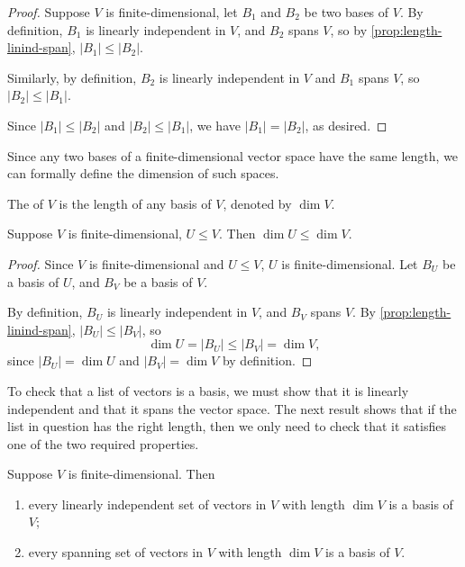 \begin{proof}
Suppose $V$ is finite-dimensional, let $B_1$ and $B_2$ be two bases of $V$. By definition, $B_1$ is linearly independent in $V$, and $B_2$ spans $V$, so by \cref{prop:length-linind-span}, $|B_1|\le|B_2|$.

Similarly, by definition, $B_2$ is linearly independent in $V$ and $B_1$ spans $V$, so $|B_2|\le|B_1|$.

Since $|B_1|\le|B_2|$ and $|B_2|\le|B_1|$, we have $|B_1|=|B_2|$, as desired.
\end{proof}

Since any two bases of a finite-dimensional vector space have the same length, we can formally define the dimension of such spaces.

\begin{definition}[Dimension]
The  of $V$ is the length of any basis of $V$, denoted by $\dim V$.
\end{definition}

\begin{proposition}\label{prop:dim-subspace}
Suppose $V$ is finite-dimensional, $U\le V$. Then $\dim U\le\dim V$.
\end{proposition}

\begin{proof}
Since $V$ is finite-dimensional and $U\le V$, $U$ is finite-dimensional. Let $B_U$ be a basis of $U$, and $B_V$ be a basis of $V$.

By definition, $B_U$ is linearly independent in $V$, and $B_V$ spans $V$. By \cref{prop:length-linind-span}, $|B_U|\le|B_V|$, so
\[\dim U=|B_U|\le|B_V|=\dim V,\]
since $|B_U|=\dim U$ and $|B_V|=\dim V$ by definition.
\end{proof}

To check that a list of vectors is a basis, we must show that it is linearly independent and that it spans the vector space. The next result shows that if the list in question has the right length, then we only need to check that it satisfies one of the two required properties.

\begin{proposition}\label{prop:basis-length-dim}
Suppose $V$ is finite-dimensional. Then
\begin{enumerate}[label=(\roman*)]
\item every linearly independent set of vectors in $V$ with length $\dim V$ is a basis of $V$;
\item every spanning set of vectors in $V$ with length $\dim V$ is a basis of $V$.
\end{enumerate}
\end{proposition}

